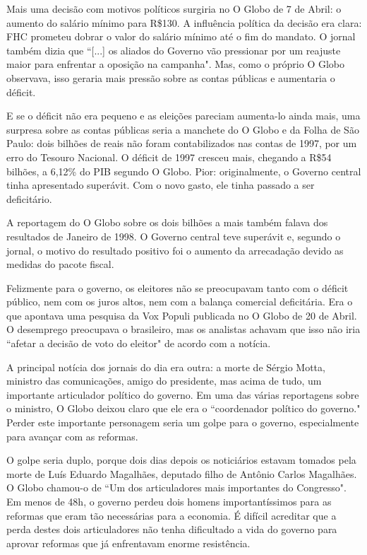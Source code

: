\documentclass{article}
\begin{document}

Mais uma decisão com motivos políticos surgiria no O Globo de 7 de Abril: o aumento do salário mínimo para R\$130. A influência política da decisão era clara: FHC prometeu dobrar o valor do salário mínimo até o fim do mandato. O jornal também dizia que ``[...] os aliados do Governo vão pressionar por um reajuste maior para enfrentar a oposição na campanha". Mas, como o próprio O Globo observava, isso geraria mais pressão sobre as contas públicas e aumentaria o déficit.        

E se o déficit não era pequeno e as eleições pareciam aumenta-lo ainda mais, uma surpresa sobre as contas públicas seria a manchete do O Globo e da Folha de São Paulo: dois bilhões de reais não foram contabilizados nas contas de 1997, por um erro do Tesouro Nacional. O déficit de 1997 cresceu mais, chegando a R\$54 bilhões, a 6,12\% do PIB segundo O Globo. Pior: originalmente, o Governo central tinha apresentado superávit. Com o novo gasto, ele tinha passado a ser deficitário. 

A reportagem do O Globo sobre os dois bilhões a mais também falava dos resultados de Janeiro de 1998. O Governo central teve superávit e, segundo o jornal, o motivo do resultado positivo foi o aumento da arrecadação devido as medidas do pacote fiscal.

Felizmente para o governo, os eleitores não se preocupavam tanto com o déficit público, nem com os juros altos, nem com a balança comercial deficitária. Era o que apontava uma pesquisa da Vox Populi publicada no O Globo de 20 de Abril. O desemprego preocupava o brasileiro, mas os analistas achavam que isso não iria ``afetar a decisão de voto do eleitor" de acordo com a notícia. %

A principal notícia  dos jornais do dia era outra: a morte de Sérgio Motta, ministro das comunicações, amigo do presidente, mas acima de tudo, um importante articulador político do governo. Em uma das várias reportagens sobre o ministro, O Globo deixou claro que ele era o ``coordenador político do governo." Perder este importante personagem seria um golpe para o governo, especialmente para avançar com as reformas.

O golpe seria duplo, porque dois dias depois os noticiários estavam tomados pela morte de Luís Eduardo Magalhães, deputado filho de Antônio Carlos Magalhães. O Globo chamou-o de ``Um dos articuladores mais importantes do Congresso". Em menos de 48h, o governo perdeu dois homens importantíssimos para as reformas que eram tão necessárias para a economia. É difícil acreditar que a perda destes dois articuladores não tenha dificultado a vida do governo para aprovar reformas que já enfrentavam enorme resistência.
\end{document}
